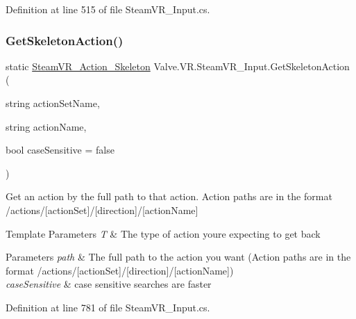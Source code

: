 Definition at line 515 of file Steam\+V\+R\+\_\+\+Input.\+cs.

\mbox{\label{class_valve_1_1_v_r_1_1_steam_v_r___input_a3484935c1c72b595c5571659dee23f99}} 
\subsubsection{\texorpdfstring{GetSkeletonAction()}{GetSkeletonAction()}\hspace{0.1cm}{\footnotesize\ttfamily [1/2]}}
{\footnotesize\ttfamily static \mbox{\hyperlink{class_valve_1_1_v_r_1_1_steam_v_r___action___skeleton}{Steam\+V\+R\+\_\+\+Action\+\_\+\+Skeleton}} Valve.\+V\+R.\+Steam\+V\+R\+\_\+\+Input.\+Get\+Skeleton\+Action (\begin{DoxyParamCaption}\item[{string}]{action\+Set\+Name,  }\item[{string}]{action\+Name,  }\item[{bool}]{case\+Sensitive = {\ttfamily false} }\end{DoxyParamCaption})\hspace{0.3cm}{\ttfamily [static]}}



Get an action by the full path to that action. Action paths are in the format /actions/\mbox{[}action\+Set\mbox{]}/\mbox{[}direction\mbox{]}/\mbox{[}action\+Name\mbox{]} 


\begin{DoxyTemplParams}{Template Parameters}
{\em T} & The type of action you\textquotesingle{}re expecting to get back\\
\hline
\end{DoxyTemplParams}

\begin{DoxyParams}{Parameters}
{\em path} & The full path to the action you want (Action paths are in the format /actions/\mbox{[}action\+Set\mbox{]}/\mbox{[}direction\mbox{]}/\mbox{[}action\+Name\mbox{]})\\
\hline
{\em case\+Sensitive} & case sensitive searches are faster\\
\hline
\end{DoxyParams}


Definition at line 781 of file Steam\+V\+R\+\_\+\+Input.\+cs.

